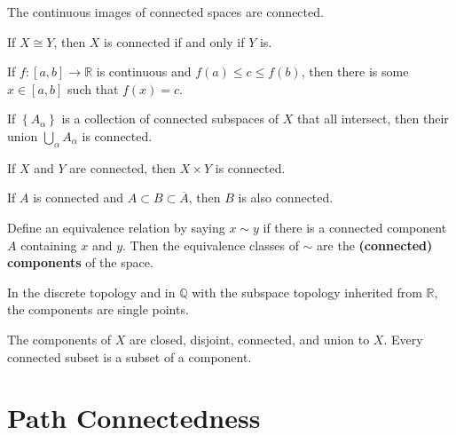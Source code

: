 \documentclass[twoside,10pt]{report}
\begin{document}
\begin{prop}
The continuous images of connected spaces are connected.
\end{prop}

\begin{cor}
	If $X \cong Y$, then $X$ is connected if and only if $Y$ is.
\end{cor}

\begin{thrm}
	If $f:[a,b]\to \mathbb{R}$ is continuous and $f(a) \leq c \leq f(b)$, then there is some $x \in [a,b]$ such that $f(x)=c$.
\end{thrm}

\begin{lem}
	If $\left\{ A_{\alpha} \right\}$ is a collection of connected subspaces of $X$ that all intersect, then their union $\bigcup_{\alpha}A_{\alpha}$ is connected.
\end{lem}

\begin{prop}
If $X$ and $Y$ are connected, then $X \times Y$ is connected.
\end{prop}

\begin{prop}
If $A$ is connected and $A \subset B \subset \overline{A}$, then $B$ is also connected.
\end{prop}

\begin{defn}[]
	Define an equivalence relation by saying $x \sim y$ if there is a connected component $A$ containing $x$ and $y$. Then the equivalence classes of $\sim$ are the \textbf{(connected) components} of the space.
\end{defn}

\begin{ex}[]
In the discrete topology and in $\mathbb{Q}$ with the subspace topology inherited from $\mathbb{R}$, the components are single points.
\end{ex}

\begin{thrm}[]
The components of $X$ are closed, disjoint, connected, and union to $X$. Every connected subset is a subset of a component.
\end{thrm}



\section{Path Connectedness}
\end{document}
